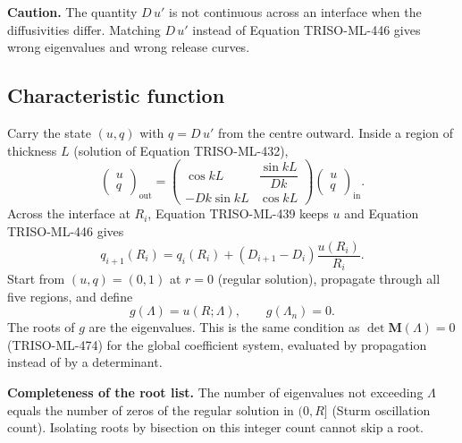 \documentclass[11pt]{article}
\begin{document}
\textbf{Caution.} The quantity $D\,u'$ is not continuous across an interface when the diffusivities differ. Matching $D\,u'$ instead of Equation TRISO-ML-446 gives wrong eigenvalues and wrong release curves.

\subsection{Characteristic function}
Carry the state $(u,q)$ with $q=D\,u'$ from the centre outward. Inside a region of thickness $L$ (solution of Equation TRISO-ML-432),
\begin{equation}
\begin{pmatrix}u\\ q\end{pmatrix}_{\mathrm{out}}=\begin{pmatrix}\cos kL & \dfrac{\sin kL}{Dk}\\[2mm] -Dk\sin kL & \cos kL\end{pmatrix}\begin{pmatrix}u\\ q\end{pmatrix}_{\mathrm{in}}.
\tag{TRISO-DEL-010}
\end{equation}
Across the interface at $R_i$, Equation TRISO-ML-439 keeps $u$ and Equation TRISO-ML-446 gives
\begin{equation}
q_{i+1}(R_i)=q_i(R_i)+\left(D_{i+1}-D_i\right)\frac{u(R_i)}{R_i}.
\tag{TRISO-DEL-011}
\end{equation}
Start from $(u,q)=(0,1)$ at $r=0$ (regular solution), propagate through all five regions, and define
\begin{equation}
g(\Lambda)=u(R;\Lambda),\qquad g(\Lambda_n)=0.
\tag{TRISO-DEL-012}
\end{equation}
The roots of $g$ are the eigenvalues. This is the same condition as $\det\mathbf M(\Lambda)=0$ (TRISO-ML-474) for the global coefficient system, evaluated by propagation instead of by a determinant.

\textbf{Completeness of the root list.} The number of eigenvalues not exceeding $\Lambda$ equals the number of zeros of the regular solution in $(0,R]$ (Sturm oscillation count). Isolating roots by bisection on this integer count cannot skip a root.
\end{document}
